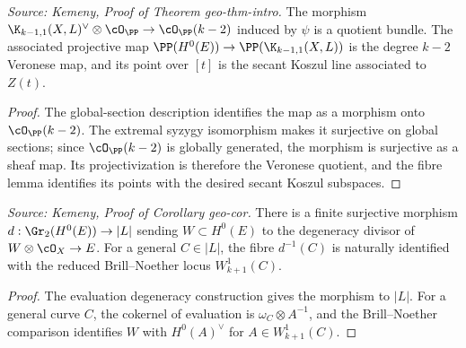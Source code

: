 \begin{theorem}
  \label{thm:kemeny_veronese_identification}
  \textit{Source: Kemeny, Proof of Theorem geo-thm-intro.}
  The morphism
  \(\K_{k-1,1}(X,L)^\vee\otimes\cO_{\PP}\to\cO_{\PP}(k-2)\) induced by \(\psi\)
  is a quotient bundle.  The associated projective map
  \(\PP(H^0(E))\to\PP(\K_{k-1,1}(X,L))\) is the degree \(k-2\) Veronese map, and
  its point over \([t]\) is the secant Koszul line associated to \(Z(t)\).
\end{theorem}
\begin{proof}
  The global-section description identifies the map as a morphism onto
  \(\cO_{\PP}(k-2)\).  The extremal syzygy isomorphism makes it surjective on
  global sections; since \(\cO_{\PP}(k-2)\) is globally generated, the morphism is
  surjective as a sheaf map.  Its projectivization is therefore the Veronese
  quotient, and the fibre lemma identifies its points with the desired secant
  Koszul subspaces.
\end{proof}

\begin{lemma}
  \label{lem:kemeny_grassmann_pencil_map}
  \textit{Source: Kemeny, Proof of Corollary geo-cor.}
  There is a finite surjective morphism
  \(d:\Gr_2(H^0(E))\to |L|\) sending \(W\subset H^0(E)\) to the degeneracy
  divisor of \(W\otimes\cO_X\to E\).  For a general \(C\in|L|\), the fibre
  \(d^{-1}(C)\) is naturally identified with the reduced Brill--Noether locus
  \(W^1_{k+1}(C)\).
\end{lemma}
\begin{proof}
  The evaluation degeneracy construction gives the morphism to \(|L|\).  For a
  general curve \(C\), the cokernel of evaluation is \(\omega_C\otimes A^{-1}\),
  and the Brill--Noether comparison identifies \(W\) with \(H^0(A)^\vee\) for
  \(A\in W^1_{k+1}(C)\).
\end{proof}

